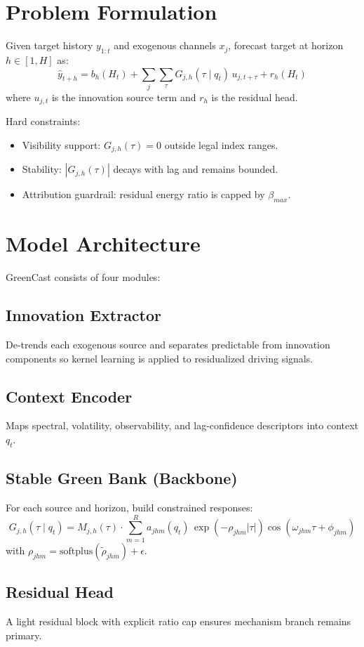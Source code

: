 \documentclass[11pt]{article}
\begin{document}
\section{Problem Formulation}
Given target history $y_{1:t}$ and exogenous channels $x_j$, forecast target at horizon $h \in [1,H]$ as:
\[
\hat y_{t+h}=b_h(H_t)+\sum_j \sum_{\tau} G_{j,h}(\tau\mid q_t)\,u_{j,t+\tau}+r_h(H_t)
\]
where $u_{j,t}$ is the innovation source term and $r_h$ is the residual head.

Hard constraints:
\begin{itemize}
\item Visibility support: $G_{j,h}(\tau)=0$ outside legal index ranges.
\item Stability: $|G_{j,h}(\tau)|$ decays with lag and remains bounded.
\item Attribution guardrail: residual energy ratio is capped by $\beta_{max}$.
\end{itemize}

\section{Model Architecture}
GreenCast consists of four modules:

\subsection{Innovation Extractor}
De-trends each exogenous source and separates predictable from innovation components so kernel learning is applied to residualized driving signals.

\subsection{Context Encoder}
Maps spectral, volatility, observability, and lag-confidence descriptors into context $q_t$.

\subsection{Stable Green Bank (Backbone)}
For each source and horizon, build constrained responses:
\[
G_{j,h}(\tau\mid q_t)=M_{j,h}(\tau) \cdot \sum_{m=1}^{R} a_{jhm}(q_t)\,\exp(-\rho_{jhm}|\tau|)\cos(\omega_{jhm}\tau+\phi_{jhm})
\]
with $\rho_{jhm}=\mathrm{softplus}(\tilde{\rho}_{jhm})+\epsilon$.

\subsection{Residual Head}
A light residual block with explicit ratio cap ensures mechanism branch remains primary.
\end{document}
